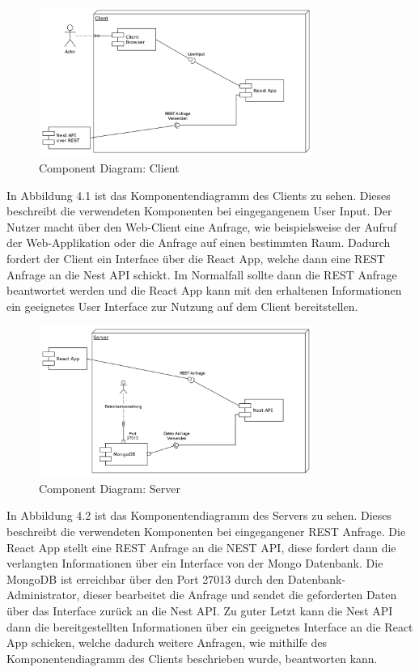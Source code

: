 \begin{figure}[!h]
    \centering
    \includegraphics[width=0.8\textwidth]{./UML_Diagrams/ComponentDiagramClient.png}
    \caption{Component Diagram: Client}
    \label{fig:ComponentDiagramClient}
\end{figure}
In Abbildung 4.1 ist das Komponentendiagramm des Clients zu sehen.
Dieses beschreibt die verwendeten Komponenten bei eingegangenem User Input.
Der Nutzer macht über den Web-Client eine Anfrage, wie beispielsweise der Aufruf der Web-Applikation oder die Anfrage auf einen bestimmten Raum.
Dadurch fordert der Client ein Interface über die React App, welche dann eine REST Anfrage an die Nest API schickt.
Im Normalfall sollte dann die REST Anfrage beantwortet werden und die React App kann mit den erhaltenen Informationen ein geeignetes User Interface zur Nutzung auf dem Client bereitstellen.

\begin{figure}[!h]
    \centering
    \includegraphics[width=0.8\textwidth]{./UML_Diagrams/ComponentDiagramServer.png}
    \caption{Component Diagram: Server}
    \label{fig:ComponentDiagramServer}
\end{figure}
In Abbildung 4.2 ist das Komponentendiagramm des Servers zu sehen.
Dieses beschreibt die verwendeten Komponenten bei eingegangener REST Anfrage.
Die React App stellt eine REST Anfrage an die NEST API, diese fordert dann die verlangten Informationen über ein Interface von der Mongo Datenbank.
Die MongoDB ist erreichbar über den Port 27013 durch den Datenbank-Administrator, dieser bearbeitet die Anfrage und sendet die geforderten Daten über das Interface zurück an die Nest API.
Zu guter Letzt kann die Nest API dann die bereitgestellten Informationen über ein geeignetes Interface an die React App schicken, welche dadurch weitere Anfragen, wie mithilfe des Komponentendiagramm des Clients beschrieben wurde, beantworten kann.




